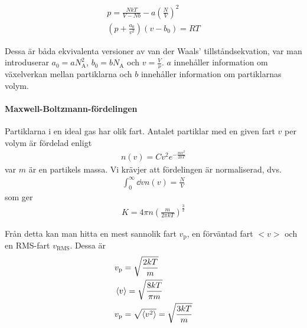 \begin{align*}
	p = \frac{NkT}{V - Nb} - a\left(\frac{N}{V}\right)^2\\
	\left(p + \frac{a_0}{v^2}\right)(v - b_0) = RT
\end{align*}

Dessa är båda ekvivalenta versioner av van der Waals' tillståndsekvation, var man introduserar $a_0 = a N_\text{A}^2$, $b_0 = bN_\text{A}$ och $v = \frac{V}{\nu}$. $a$ innehåller information om växelverkan mellan partiklarna och $b$ innehåller information om partiklarnas volym.

\paragraph{Maxwell-Boltzmann-fördelingen}

Partiklarna i en ideal gas har olik fart. Antalet partiklar med en given fart $v$ per volym är fördelad enligt
\begin{align*}
	n(v) = Cv^2e^{-\frac{mv^2}{2kT}}
\end{align*}
var $m$ är en partikels massa. Vi krävjer att fördelingen är normaliserad, dvs.
\begin{align*}
	\int_0^{\infty}\dd{v}n(v) = \frac{N}{V}
\end{align*}
som ger
\begin{align*}
	K = 4\pi n \left(\frac{m}{2\pi kT}\right)^\frac{3}{2}
\end{align*}

Från detta kan man hitta en mest sannolik fart $v_\text{p}$, en förväntad fart $<v>$ och en RMS-fart $v_\text{RMS}$. Dessa är
\begin{align*}
	& v_\text{p} = \sqrt{\frac{2kT}{m}}\\
	& \expval{v} = \sqrt{\frac{8kT}{\pi m}}\\
	& v_\text{p} = \sqrt{\expval{v^2}} = \sqrt{\frac{3kT}{m}}\\
\end{align*}